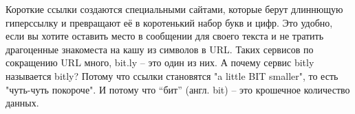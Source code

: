 \begin{mdframed}[nobreak=true]
\sloppy %
    Короткие ссылки создаются специальными сайтами, которые берут длиннющую 
    гиперссылку и превращают её в коротенький набор букв и цифр. Это удобно, 
    если вы хотите оставить место в сообщении для своего текста и 
    не тратить драгоценные знакоместа на кашу из символов в URL.  
    Таких сервисов по сокращению URL много, bit.ly -- это один из них. 
    А почему сервис bitly называется bitly? Потому что ссылки становятся "a little BIT smaller", то есть "чуть-чуть покороче". 
    И потому что ``бит'' (англ. bit) -- это крошечное количество данных. 
\end{mdframed}

